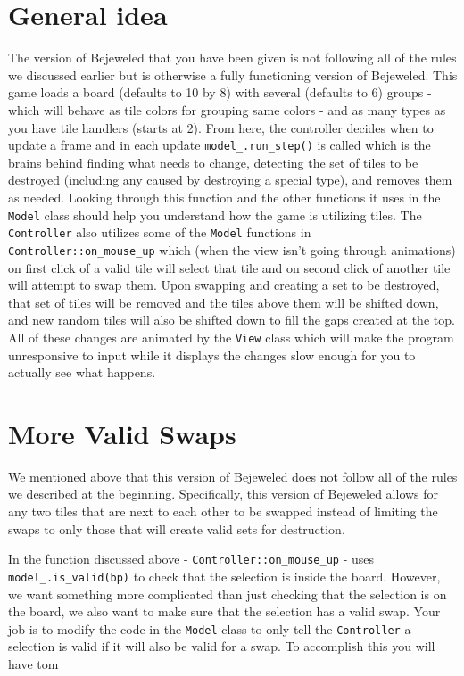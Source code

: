 \documentclass{tufte-handout}
\begin{document}
\section{General idea}

The version of Bejeweled that you have been given is not following all
of the rules we discussed earlier but is otherwise a fully functioning
version of Bejeweled. This game loads a board (defaults to 10 by 8) with
several (defaults to 6) groups - which will behave as tile colors for
grouping same colors - and as many types as you have tile handlers (starts
at 2). From here, the controller decides when to update a frame and in each
update \verb!model_.run_step()! is called which is the brains behind
finding what needs to change, detecting the set of tiles to be destroyed
(including any caused by destroying a special type), and removes them as
needed. Looking through this function and the other functions it uses in
the \verb^Model^ class should help you understand how the game is utilizing
tiles. The \verb^Controller^ also utilizes some of the \verb^Model^ functions
in \verb!Controller::on_mouse_up! which (when the view isn't going through
animations) on first click of a valid tile will select that tile and on
second click of another tile will attempt to swap them. Upon swapping and
creating a set to be destroyed, that set of tiles will be removed and the
tiles above them will be shifted down, and new random tiles will also be
shifted down to fill the gaps created at the top. All of these changes are
animated by the \verb^View^ class which will make the program unresponsive to
input while it displays the changes slow enough for you to actually see what
happens.

\section{More Valid Swaps}

We mentioned above that this version of Bejeweled does not follow all of the
rules we described at the beginning. Specifically, this version of Bejeweled
allows for any two tiles that are next to each other to be swapped instead of
limiting the swaps to only those that will create valid sets for destruction.

In  the function discussed above -
\verb!Controller::on_mouse_up! - uses \verb!model_.is_valid(bp)! to check that
the selection is inside the board. However, we want something more complicated
than just checking that the selection is on the board, we also want to make
sure that the selection has a valid swap. Your job is to modify the code in the
\verb^Model^ class to only tell the \verb^Controller^ a selection is valid if
it will also be valid for a swap. To accomplish this you will have tom
\end{document}
